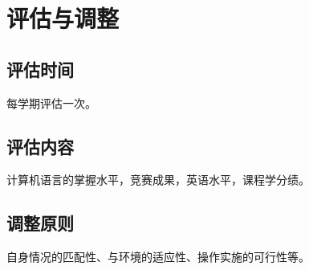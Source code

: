 \documentclass{article}
\begin{document}
\section{评估与调整}

\subsection{评估时间}
每学期评估一次。\par 

\subsection{评估内容}
计算机语言的掌握水平，竞赛成果，英语水平，课程学分绩。\par

\subsection{调整原则}
自身情况的匹配性、与环境的适应性、操作实施的可行性等。\par
\end{document}
